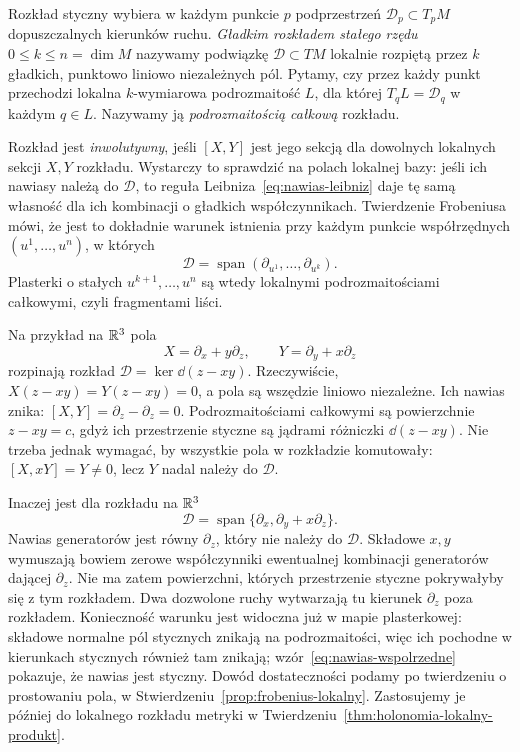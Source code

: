 \begin{uwaga}
Rozkład styczny wybiera w każdym punkcie $p$ podprzestrzeń
$\mathcal D_p\subset T_pM$ dopuszczalnych kierunków ruchu.
\emph{Gładkim rozkładem stałego rzędu} $0\leq k\leq n=\dim M$
nazywamy podwiązkę $\mathcal D\subset TM$ lokalnie rozpiętą
przez $k$ gładkich, punktowo liniowo niezależnych pól.
Pytamy, czy przez każdy punkt przechodzi lokalna
$k$-wymiarowa podrozmaitość $L$, dla której
$T_qL=\mathcal D_q$ w każdym $q\in L$.
Nazywamy ją \emph{podrozmaitością całkową} rozkładu.

Rozkład jest \emph{inwolutywny}, jeśli $[X,Y]$ jest jego sekcją
dla dowolnych lokalnych sekcji $X,Y$ rozkładu.
Wystarczy to sprawdzić na polach lokalnej bazy:
jeśli ich nawiasy należą do $\mathcal D$, to reguła
Leibniza~\eqref{eq:nawias-leibniz} daje tę samą własność
dla ich kombinacji o gładkich współczynnikach.
Twierdzenie Frobeniusa mówi, że jest to dokładnie warunek
istnienia przy każdym punkcie współrzędnych $(u^1,\ldots,u^n)$,
w których
\[
 \mathcal D=\operatorname{span}
 (\partial_{u^1},\ldots,\partial_{u^k}).
\]
Plasterki o stałych $u^{k+1},\ldots,u^n$ są wtedy lokalnymi
podrozmaitościami całkowymi, czyli fragmentami liści.

Na przykład na $\mathbb{R}^3$ pola
\[
 X=\partial_x+y\partial_z,\qquad
 Y=\partial_y+x\partial_z
\]
rozpinają rozkład $\mathcal D=\ker\dd(z-xy)$.
Rzeczywiście, $X(z-xy)=Y(z-xy)=0$, a pola są wszędzie
liniowo niezależne. Ich nawias znika:
$[X,Y]=\partial_z-\partial_z=0$.
Podrozmaitościami całkowymi są powierzchnie $z-xy=c$,
gdyż ich przestrzenie styczne są jądrami różniczki $\dd(z-xy)$.
Nie trzeba jednak wymagać, by wszystkie pola w rozkładzie
komutowały: $[X,xY]=Y\ne0$, lecz $Y$ nadal należy do
$\mathcal D$.

Inaczej jest dla rozkładu na $\mathbb{R}^3$
\[
 \mathcal D
 =\operatorname{span}\{\partial_x,\partial_y+x\partial_z\}.
\]
Nawias generatorów jest równy $\partial_z$, który nie należy do $\mathcal D$.
Składowe $x,y$ wymuszają bowiem zerowe współczynniki
ewentualnej kombinacji generatorów dającej $\partial_z$.
Nie ma zatem powierzchni, których przestrzenie styczne pokrywałyby się
z tym rozkładem. Dwa dozwolone ruchy wytwarzają tu
kierunek $\partial_z$ poza rozkładem.
Konieczność warunku jest widoczna już w mapie
plasterkowej: składowe normalne pól stycznych znikają na
podrozmaitości, więc ich pochodne w kierunkach stycznych również
tam znikają; wzór~\eqref{eq:nawias-wspolrzedne} pokazuje,
że nawias jest styczny. Dowód dostateczności podamy po twierdzeniu
o prostowaniu pola, w Stwierdzeniu~\ref{prop:frobenius-lokalny}.
Zastosujemy je później do lokalnego rozkładu metryki
w Twierdzeniu~\ref{thm:holonomia-lokalny-produkt}.
\end{uwaga}

